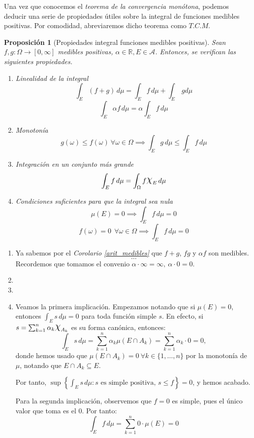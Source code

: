 \documentclass[11pt, a4paper]{article}
\makeatletter
\newif\IfInSansMode
\let\oldsf\sffamily
\renewcommand*{\sffamily}{\oldsf\mathversion{sans}\InSansModetrue}
\let\oldnorm\normalfont
\renewcommand*{\normalfont}{\oldnorm\InSansModefalse\mathversion{normal}}
\newcommand{\R}{\mathbb{R}} \newcommand{\N}{\mathbb{N}}
\DeclareRobustCommand{\rchi}{{\Large \mathpalette\irchi\relax}}
\newcommand{\irchi}[2]{\raisebox{0.4\depth}{$#1\chi$}} %
\newcommand{\W}{\Omega}
\newcommand{\w}{\omega}
\renewenvironment{proof}[1][\proofname] {\par\pushQED{\qed}\normalfont\topsep6\p@\@plus6\p@\relax\trivlist\item[\hskip\labelsep\itshape\sffamily#1\@addpunct{.}]\ignorespaces}{\popQED\endtrivlist\@endpefalse}
\theoremstyle{theorem-style}
\newtheorem{nprop}{Proposición}[section]
\theoremstyle{definition-style}
\theoremstyle{remark-style}
\theoremstyle{example-style}
\newenvironment{nlist}
{\begin{enumerate}
    \renewcommand\labelenumi{(\emph{\roman{enumi})}}}
  {\end{enumerate}}
\makeatother
\begin{document}
Una vez que conocemos el \textit{teorema de la convergencia monótona}, podemos deducir una serie de propiedades útiles sobre la integral de funciones medibles positivas. Por comodidad, abreviaremos dicho teorema como $T.C.M$.

\begin{nprop}[Propiedades integral funciones medibles positivas] \label{int_medibles}
Sean \\ $f,g:\Omega \to [0,\infty]$ medibles positivas, $\alpha \in \R, E \in \mathscr A$. Entonces, se verifican las siguientes propiedades.

\begin{nlist}
\item Linealidad de la integral
  \[
    \int_E (f+g)\, d\mu = \int_E f\, d\mu + \int_E\, g d\mu
  \]
  \[
    \int_E \alpha f\, d\mu = \alpha \int_E f\, d\mu
  \]
  
\item Monotonía $$g(\omega) \leq f(\omega) \ \forall \omega \in \Omega \implies \int_E g\, d\mu \leq \int_E f\, d \mu$$
  
\item Integración en un conjunto más grande $$\int_E f\, d \mu =  \int_\Omega f\rchi_E \,d\mu$$

\item Condiciones suficientes para que la integral sea nula $$\mu(E) = 0 \implies \int_E f\, d\mu = 0$$ $$f(\w) = 0 \ \ \forall \w \in \W \implies \int_E f\,d\mu = 0$$
\end{nlist}
\end{nprop}

\begin{proof}\hfill
\begin{nlist}
    \item Ya sabemos por el \textit{Corolario \ref{arit_medibles}} que $f+g$, $fg$ y $\alpha f$ son medibles. 
    $$\dots$$
    Recordemos que tomamos el convenio $\alpha \cdot \infty = \infty, \ \alpha \cdot 0 = 0$.
    
    \item
    \item
    \item Veamos la primera implicación. Empezamos notando que si $\mu(E) = 0$, entonces $\int_E s\,d\mu = 0$ para toda función simple $s$. En efecto, si $s = \sum_{k=1}^n \alpha_k \rchi_{A_k}$ es su forma canónica, entonces: $$\int_E s\,d\mu = \sum_{k=1}^n \alpha_k \mu(E \cap A_k) = \sum_{k=1}^n \alpha_k \cdot 0 = 0,$$ donde hemos usado que $\mu(E\cap A_k) = 0\ \forall k \in \{1,\dots,n\}$ por la monotonía de $\mu$, notando que $E\cap A_k \subseteq E$.
    
    Por tanto, $\displaystyle \sup\left\{\int_E s\,d\mu : s \text{ es simple positiva, } s \le f \right\} = 0$, y hemos acabado.
    
    Para la segunda implicación, observemos que $f=0$ es simple, pues el único valor que toma es el 0. Por tanto: $$\int_E f\,d\mu =  \sum_{k=1}^n 0\cdot \mu(E) = 0$$
\end{nlist}
\end{proof}
\end{document}

